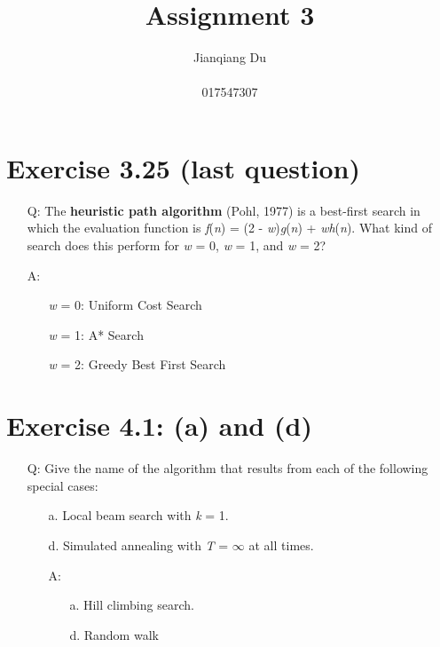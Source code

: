 \documentclass{article}
\begin{document}
\title{\LARGE Assignment 3}
\author{Jianqiang Du\\\\017547307}
\maketitle

\section{Exercise 3.25 (last question)}
\begin{itemize}
\item[Q:]The \textbf{heuristic path algorithm} (Pohl, 1977) is a best-first search in which the evaluation function is \textit f(\textit n) = (2 - \textit w)\textit g(\textit n) + \textit{wh}(\textit n). What kind of search does this perform for \textit w = 0, \textit w = 1, and \textit w = 2?
\item[A:]
\begin{itemize}
\setlength{\itemindent}{0.2in}
\item[\textit w = 0:]Uniform Cost Search
\item[\textit w = 1:]A* Search
\item[\textit w = 2:]Greedy Best First Search
\end{itemize}
\end{itemize}

\section{Exercise 4.1: (a) and (d)}
\begin{itemize}
\item[Q:]Give the name of the algorithm that results from each of the following special cases:
\begin{itemize}
\item[a.]Local beam search with \textit k = 1.
\item[d.]Simulated annealing with \textit T = $\infty$ at all times.
\end{itemize}
\begin{itemize}
\setlength{\itemindent}{-0.3in}
\item[A:]
\begin{itemize}
\setlength{\itemindent}{-0.07in}
\item[a.]Hill climbing search.
\setlength{\itemindent}{-0.37in}
\item[d.]Random walk
\end{itemize}
\end{itemize}
\end{itemize}
\end{document}
